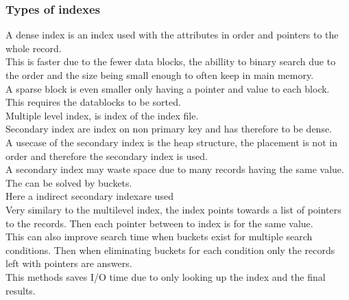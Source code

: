 \documentclass[12pt, a4paper]{article}
\begin{document}
			\subsubsection{Types of indexes}
				A dense index is an index used with the attributes in order and pointers to the whole record.\\
				This is faster due to the fewer data blocks, the abillity to binary search due to the order and the size being small enough to often keep in main memory.\\
				A sparse block is even smaller only having a pointer and value to each block. This requires the datablocks to be sorted.\\
				Multiple level index, is index of the index file.\\
				Secondary index are index on non primary key and has therefore to be dense. \\
				A usecase of the secondary index is the heap structure, the placement is not in order and therefore the secondary index is used.\\
				A secondary index may waste space due to many records having the same value. The can be solved by buckets.\\
				Here a indirect secondary indexare used\\
				Very similary to the multilevel index, the index points towards a list of pointers to the records. Then each pointer between to index is for the same value.\\
				This can also improve search time when buckets exist for multiple search conditions. Then when eliminating buckets for each condition only the records left with pointers are answers.\\
				This methods saves I/O time due to only looking up the index and the final results.\\
\end{document}

